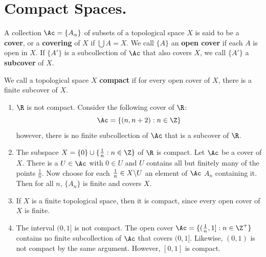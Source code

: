 
\section{Compact Spaces.}

\begin{definition}
    A collection $\Ac=\{A_{\alpha}\}$ of subsets of a topological space $X$ is said to be a  \textbf{cover}, or a
    \textbf{covering} of $X$ if  $\bigcup{A}=X$. We call $\{A\}$ an \textbf{open cover} if each $A$
    is open in  $X$. If  $\{A'\}$ is a subcollection of $\Ac$ that also covers $X$, we call
    $\{A'\}$ a \textbf{subcover} of $X$.
\end{definition}

\begin{definition}
    We call a topological space $X$ \textbf{compact} if for every open cover of $X$, there is a
    finite subcover of $X$.
\end{definition}

\begin{example}
    \begin{enumerate}[label=(\arabic*)]
        \item     $\R$ is not compact. Consider the following cover of  $\R$:
            \begin{equation*}
                \Ac=\{(n,n+2):n \in \Z\}
            \end{equation*}
            however, there is no finite subcollection of $\Ac$ that is a subcover of  $\R$.

        \item The subspace $X=\{0\} \cup \{\frac{1}{n}: n \in \Z\}$ of $\R$ is compact. Let  $\Ac$
            be a cover of  $X$. There is a  $U \in \Ac$ with  $0 \in U$ and $U$ contains all but
            finitely many of the points  $ \frac{1}{n}$. Now choose for each $\frac{1}{n} \in
            X \backslash U$ an element of $\Ac$ $A_{n}$ containing it. Then for all $n$,  $\{A_n\}$ is
            finite and covers $X$.

        \item If  $X$ is a finite topological space, then it is compact, since every open cover of
            $X$ is finite.

        \item The interval  $(0,1]$ is not compact. The open cover $\Ac=\{(\frac{1}{n}, 1]: n \in
            \Z^+\}$ contains no finite subcollection of $\Ac$ that covers  $(0,1]$. Likewise,
            $(0,1)$ is not compact by the same argument. However, $[0,1]$ is compact.
    \end{enumerate}
\end{example} 

